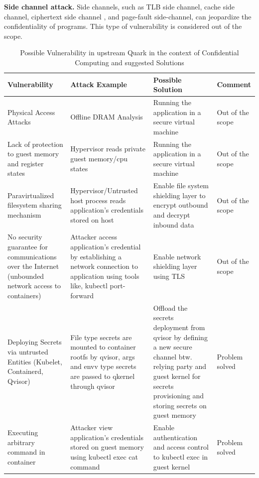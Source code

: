 \textbf{Side channel attack.} Side channels, such as TLB side channel\cite*{217454}, cache side channel\cite*{7163050}, ciphertext side channel\cite*{274707} , and page-fault side-channel\cite*{236278}, can jeopardize the confidentiality of programs.  This type of vulnerability is considered out of the scope.



\begin{table}[H]
    \tiny
    \caption{Possible Vulnerability in upstream Quark in the context of Confidential Computing and suggested Solutions}
    \label{crouch}
    \begin{tabular}{  p{3.4cm}  p{3.4cm}  p{3.4cm} p{2cm} }
        \toprule
\textbf{Vulnerability}      
& \textbf{Attack Example}   
& \textbf{Possible Solution}
& \textbf{Comment}  \\\midrule
Physical Access Attacks
& Offline DRAM Analysis          
& Running the application in a secure virtual machine
& Out of the scope   \\\hline
Lack of protection to guest memory and register states          
& Hypervisor reads private guest memory/cpu states                          
& Running the application in a secure virtual machine
& Out of the scope   \\\hline
Paravirtualized filesystem sharing mechanism       
& Hypervisor/Untrusted host process reads application’s credentials stored on host
& Enable file system shielding layer to encrypt outbound and decrypt inbound data 
& Out of the scope   \\\hline

No security guarantee for communications over the Internet (unbounded network access to containers)     
& Attacker access application’s credential by establishing a network connection to application using tools like, kubectl port-forward
& Enable network shielding layer using TLS
& Out of the scope   \\\hline

Deploying Secrets via untrusted Entities (Kubelet, Containerd, Qvisor)    
& File type secrets are mounted to container rootfs by qvisor, args and envv type secrets are passed to qkernel through qvisor
& Offload the secrets deployment from qvisor by defining a new secure channel btw. relying party and guest kernel for secrets provisioning and storing secrets on guest memory
& Problem solved  \\\hline

Executing arbitrary command in container  
& Attacker view application’s credentials stored on guest memory using kubectl exec cat command
& Enable authentication and access control to kubectl exec in guest kernel
& Problem solved  \\\hline



\end{tabular}
\end{table}
